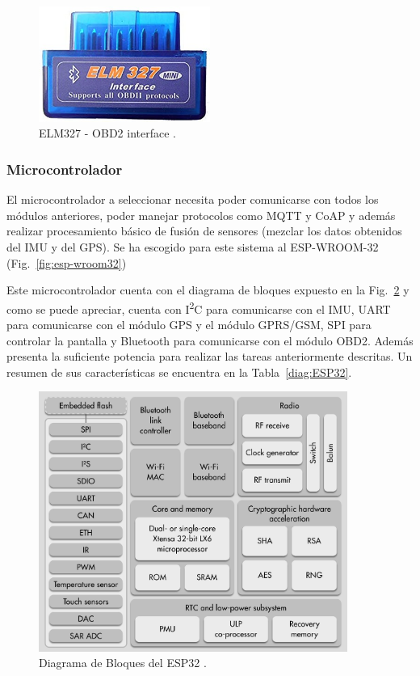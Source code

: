 \begin{figure}[hbtp!]
\centering
\includegraphics[width=0.5\textwidth]{OBD.jpg}
\caption[ELM327 - OBD2 interface]{ELM327 - OBD2 interface \cite{OBD}.}
\label{fig:OBD}
\end{figure}








\subsubsection{Microcontrolador}
El microcontrolador a seleccionar necesita poder comunicarse con todos los módulos anteriores, poder manejar protocolos como MQTT y CoAP y además realizar procesamiento básico de fusión de sensores (mezclar los datos obtenidos del IMU y del GPS). Se ha escogido para este sistema al ESP-WROOM-32 (Fig.~\ref{fig:esp-wroom32})

Este microcontrolador cuenta con el diagrama de bloques expuesto en la Fig.~\ref{fig:Bloques_esp32} y como se puede apreciar, cuenta con I\textsuperscript{2}C para comunicarse con el IMU, UART para comunicarse con el módulo GPS y el módulo GPRS/GSM, SPI para controlar la pantalla y Bluetooth para comunicarse con el módulo OBD2. Además presenta la suficiente potencia para realizar las tareas anteriormente descritas. Un resumen de sus características se encuentra en la Tabla~\ref{diag:ESP32}.

\begin{figure}[hbtp!]
\centering
\includegraphics[width=0.9\textwidth]{ESP32_Function_Block_Diagram.jpg}
\caption{Diagrama de Bloques del ESP32  \cite{Esp32}.}
\label{fig:Bloques_esp32}
\end{figure}


